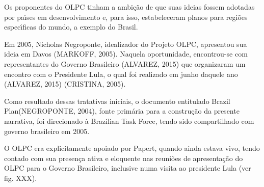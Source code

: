 \documentclass[
12pt,		%
openright,	%
twoside,  %
a4paper,			%
chapter=TITLE,		%
english,			%
french,				%
spanish,			%
brazil				%
]{USPSC-classe/USPSC}
\begin{document}
Os proponentes do OLPC tinham a ambi\c{c}\~ao de que suas ideias fossem adotadas por pa\'{\i}ses em desenvolvimento e, para isso, estabeleceram planos para regi\~oes espec\'{\i}ficas do mundo, a exemplo do Brasil.

















Em 2005, Nicholas Negroponte, idealizador do Projeto OLPC, apresentou sua ideia em Davos (MARKOFF, 2005). Naquela oportunidade, encontrou-se com representantes do Governo Brasileiro (ALVAREZ, 2015) que organizaram um encontro com o Presidente Lula, o qual foi realizado em junho daquele ano (ALVAREZ, 2015) (CRISTINA, 2005).

















Como resultado dessas tratativas iniciais, o documento entitulado \textquotedbl Brazil Plan\textquotedbl   (NEGROPONTE, 2004), fonte prim\'aria para a constru\c{c}\~ao da presente narrativa, foi direcionado \`a \textquotedbl Brazilian Task Force\textquotedbl , tendo sido compartilhado com governo brasileiro em 2005.

















O OLPC era explicitamente apoiado por Papert, quando ainda estava vivo, tendo contado com sua presen\c{c}a ativa e eloquente nas reuni\~oes de apresenta\c{c}\~ao do OLPC para o Governo Brasileiro, inclusive numa visita ao presidente Lula (ver fig. XXX).
\end{document}
